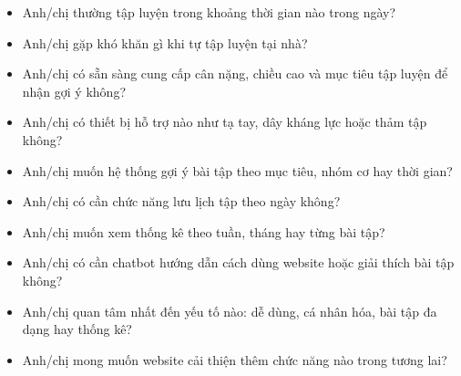 
\begin{itemize}

    \item Anh/chị thường tập luyện trong khoảng thời gian nào trong ngày?

    \item Anh/chị gặp khó khăn gì khi tự tập luyện tại nhà?

    \item Anh/chị có sẵn sàng cung cấp cân nặng, chiều cao và mục tiêu tập luyện để nhận gợi ý không?

    \item Anh/chị có thiết bị hỗ trợ nào như tạ tay, dây kháng lực hoặc thảm tập không?

    \item Anh/chị muốn hệ thống gợi ý bài tập theo mục tiêu, nhóm cơ hay thời gian?

    \item Anh/chị có cần chức năng lưu lịch tập theo ngày không?

    \item Anh/chị muốn xem thống kê theo tuần, tháng hay từng bài tập?

    \item Anh/chị có cần chatbot hướng dẫn cách dùng website hoặc giải thích bài tập không?

    \item Anh/chị quan tâm nhất đến yếu tố nào: dễ dùng, cá nhân hóa, bài tập đa dạng hay thống kê?

    \item Anh/chị mong muốn website cải thiện thêm chức năng nào trong tương lai?

\end{itemize}


